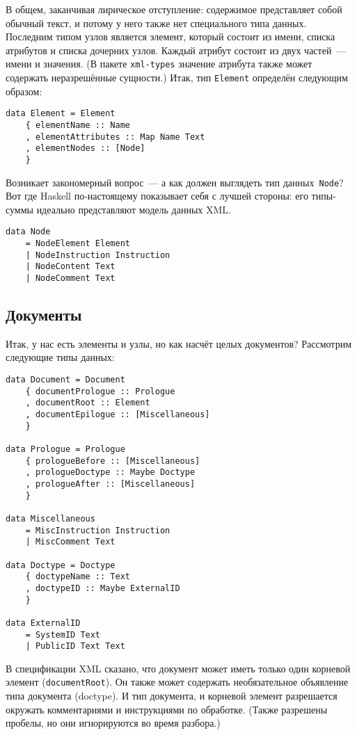 В общем, заканчивая лирическое отступление: содержимое представляет собой
обычный текст, и потому у него также нет специального типа данных. Последним
типом узлов является элемент, который состоит из имени, списка атрибутов и
списка дочерних узлов. Каждый атрибут состоит из двух частей~--- имени и
значения. (В пакете \lstinline!xml-types! значение атрибута также может
содержать неразрешённые сущности.) Итак, тип \lstinline!Element! определён
следующим образом:
\begin{lstlisting}
data Element = Element
    { elementName :: Name
    , elementAttributes :: Map Name Text
    , elementNodes :: [Node]
    }
\end{lstlisting}

Возникает закономерный вопрос~--- а как должен выглядеть тип
данных~\lstinline!Node!? Вот где Haskell по-настоящему показывает себя с лучшей
стороны: его типы-суммы идеально представляют модель данных XML.

\begin{lstlisting}
data Node
    = NodeElement Element
    | NodeInstruction Instruction
    | NodeContent Text
    | NodeComment Text
\end{lstlisting}

\subsection{Документы}
Итак, у нас есть элементы и узлы, но как насчёт целых документов? Рассмотрим
следующие типы данных:
\begin{lstlisting}
data Document = Document
    { documentPrologue :: Prologue
    , documentRoot :: Element
    , documentEpilogue :: [Miscellaneous]
    }

data Prologue = Prologue
    { prologueBefore :: [Miscellaneous]
    , prologueDoctype :: Maybe Doctype
    , prologueAfter :: [Miscellaneous]
    }

data Miscellaneous
    = MiscInstruction Instruction
    | MiscComment Text

data Doctype = Doctype
    { doctypeName :: Text
    , doctypeID :: Maybe ExternalID
    }

data ExternalID
    = SystemID Text
    | PublicID Text Text
\end{lstlisting}

В спецификации XML сказано, что документ может иметь только один корневой
элемент (\lstinline!documentRoot!). Он также может содержать необязательное
объявление типа документа (doctype). И тип документа, и корневой элемент
разрешается окружать комментариями и инструкциями по обработке. (Также
разрешены пробелы, но они игнорируются во время разбора.)

